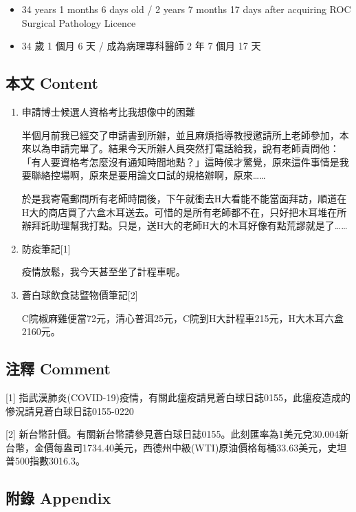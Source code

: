 \documentclass[a5paper, 12pt
]{book}
\providecommand{\tightlist}{%
  \setlength{\itemsep}{0pt}\setlength{\parskip}{0pt}}
\begin{document}
\begin{itemize}
\tightlist
\item
  34 years 1 months 6 days old / 2 years 7 months 17 days after
  acquiring ROC Surgical Pathology Licence
\item
  34 歲 1 個月 6 天 / 成為病理專科醫師 2 年 7 個月 17 天
\end{itemize}

\hypertarget{ux672cux6587-content-89}{%
\subsection{本文 Content}\label{ux672cux6587-content-89}}

\begin{enumerate}
\def\labelenumi{\arabic{enumi}.}
\item
  申請博士候選人資格考比我想像中的困難

  半個月前我已經交了申請書到所辦，並且麻煩指導教授邀請所上老師參加，本來以為申請完畢了。結果今天所辦人員突然打電話給我，說有老師責問他：「有人要資格考怎麼沒有通知時間地點？」這時候才驚覺，原來這件事情是我要聯絡控場啊，原來是要用論文口試的規格辦啊，原來\ldots\ldots{}

  於是我寄電郵問所有老師時間後，下午就衝去H大看能不能當面拜訪，順道在H大的商店買了六盒木耳送去。可惜的是所有老師都不在，只好把木耳堆在所辦拜託助理幫我打點。只是，送H大的老師H大的木耳好像有點荒謬就是了\ldots\ldots{}
\item
  防疫筆記{[}1{]}

  疫情放鬆，我今天甚至坐了計程車呢。
\item
  蒼白球飲食誌暨物價筆記{[}2{]}

  C院椒麻雞便當72元，清心普洱25元，C院到H大計程車215元，H大木耳六盒2160元。
\end{enumerate}

\hypertarget{ux6ce8ux91cb-comment-89}{%
\subsection{注釋 Comment}\label{ux6ce8ux91cb-comment-89}}

{[}1{]}
指武漢肺炎(COVID-19)疫情，有關此瘟疫請見蒼白球日誌0155，此瘟疫造成的慘況請見蒼白球日誌0155-0220

{[}2{]}
新台幣計價。有關新台幣請參見蒼白球日誌0155。此刻匯率為1美元兌30.004新台幣，金價每盎司1734.40美元，西德州中級(WTI)原油價格每桶33.63美元，史坦普500指數3016.3。

\hypertarget{ux9644ux9304-appendix-89}{%
\subsection{附錄 Appendix}\label{ux9644ux9304-appendix-89}}
\end{document}
